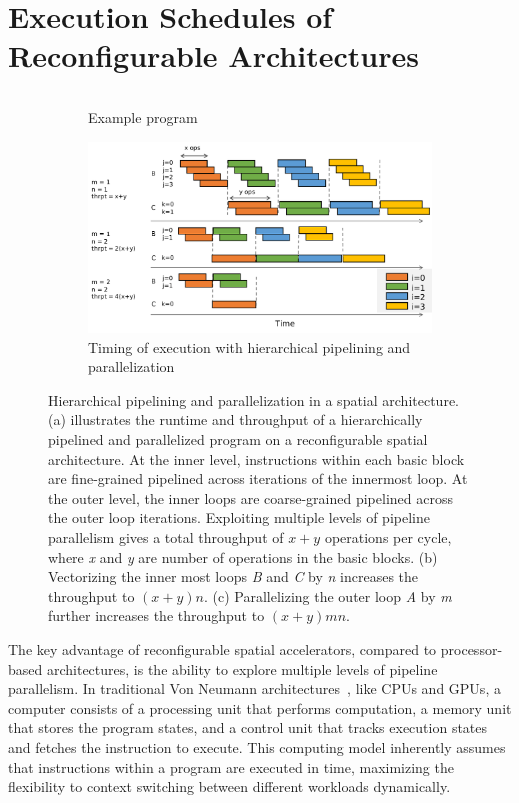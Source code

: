 \section{Execution Schedules of Reconfigurable Architectures} 
\begin{figure}
\begin{subfigure}[b]{0.34\textwidth}
\inputminted{python}{code/spatialeg2.py}
\caption {
  Example program
}
\end{subfigure}
\hfill
\begin{subfigure}[b]{0.65\textwidth}
\centering
\includegraphics[width=1.0\textwidth]{figs/pipeexec.pdf}
\caption {
  Timing of execution with hierarchical pipelining and parallelization
}
\end{subfigure}
\caption[Hiearchical pipelining and parallelization on spatial architecture]{
Hierarchical pipelining and parallelization in a spatial architecture.
(a) illustrates the runtime and throughput of a hierarchically pipelined and parallelized program on
a reconfigurable spatial architecture. 
At the inner level, instructions within each basic
block are fine-grained pipelined across iterations of the innermost loop. 
At the outer level, the inner loops are coarse-grained pipelined across the outer loop iterations.
Exploiting multiple levels of pipeline parallelism gives a total throughput of $x+y$ operations per
  cycle, where \emph{x} and \emph{y} are number of operations in the basic blocks.
  (b) Vectorizing the inner most loops \emph{B} and \emph{C} by \emph{n} increases the throughput to $(x+y)n$.
  (c) Parallelizing the outer loop \emph{A} by \emph{m} further increases the throughput to $(x+y)mn$.
}
\label{fig:pipeexec}
\end{figure}

The key advantage of reconfigurable spatial accelerators, compared to processor-based architectures, 
is the ability to explore multiple levels of pipeline parallelism. 
In traditional Von Neumann architectures~\cite{vonneumann}, like CPUs and GPUs,
a computer consists of a processing unit that performs
computation, a memory unit that stores the program states, and a control unit that tracks execution states and fetches the instruction to execute. This computing model inherently assumes that
instructions within a program are executed in time, maximizing the flexibility to context switching between different workloads dynamically.

